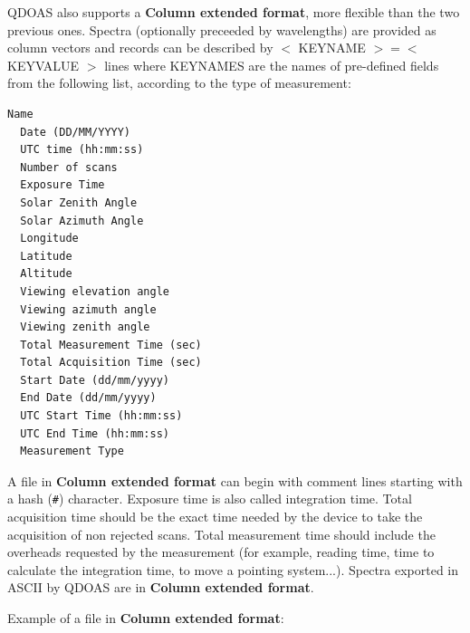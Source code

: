 QDOAS also supports a \textbf{Column extended format}, more flexible than the two previous ones.  Spectra (optionally preceeded by wavelengths) are provided as column vectors and records can be described by $<$ KEYNAME $> = <$ KEYVALUE $>$ lines
where KEYNAMES are the names of pre-defined fields from the following list, according to the type of measurement:

\begin{Verbatim}[fontfamily=courier,fontsize=\relsize{-2}]
  Name
  Date (DD/MM/YYYY)
  UTC time (hh:mm:ss)
  Number of scans
  Exposure Time
  Solar Zenith Angle
  Solar Azimuth Angle
  Longitude
  Latitude
  Altitude
  Viewing elevation angle
  Viewing azimuth angle
  Viewing zenith angle
  Total Measurement Time (sec)
  Total Acquisition Time (sec)
  Start Date (dd/mm/yyyy)
  End Date (dd/mm/yyyy)
  UTC Start Time (hh:mm:ss)
  UTC End Time (hh:mm:ss)
  Measurement Type
\end{Verbatim}

A file in \textbf{Column extended format} can begin with comment lines starting with a hash (\texttt{\#}) character. Exposure time is also called integration time.  Total acquisition time should be the exact time needed by the device
to take the acquisition of non rejected scans.  Total measurement time should include the overheads requested by the measurement (for example, reading time, time to calculate the integration time, to move a pointing system...).
Spectra exported in ASCII by QDOAS are in \textbf{Column extended format}.

Example of a file in \textbf{Column extended format}:

